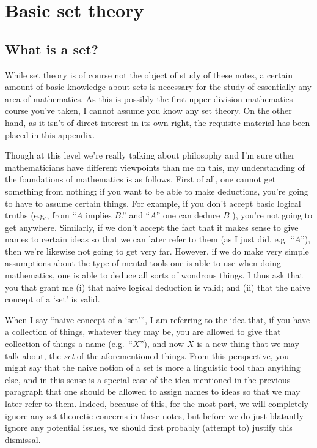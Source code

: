 \chapter{Basic set theory}

\section{What is a set?}\label{sbsA.1.1}

While set theory is of course not the object of study of these notes, a certain amount of basic knowledge about sets is necessary for the study of essentially any area of mathematics.  As this is possibly the first upper-division mathematics course you've taken, I cannot assume you know any set theory.  On the other hand, as it isn't of direct interest in its own right, the requisite material has been placed in this appendix.

Though at this level we're really talking about philosophy and I'm sure other mathematicians have different viewpoints than me on this, my understanding of the foundations of mathematics is as follows.  First of all, one cannot get something from nothing; if you want to be able to make deductions, you're going to have to assume certain things.  For example, if you don't accept basic logical truths (e.g., from ``$A$ implies $B$.'' and ``$A$'' one can deduce $B$ ), you're not going to get anywhere.  Similarly, if we don't accept the fact that it makes sense to give names to certain ideas so that we can later refer to them (as I just did, e.g. ``$A$''), then we're likewise not going to get very far.  However, if we do make very simple assumptions about the type of mental tools one is able to use when doing mathematics, one is able to deduce all sorts of wondrous things.  I thus ask that you that grant me (i) that naive logical deduction is valid; and (ii) that the naive concept of a `set' is valid.

When I say ``naive concept of a `set'{}'', I am referring to the idea that, if you have a collection of things, whatever they may be, you are allowed to give that collection of things a name (e.g.~``$X$''), and now $X$ is a new thing that we may talk about, the \emph{set} of the aforementioned things.  From this perspective, you might say that the naive notion of a set is more a linguistic tool than anything else, and in this sense is a special case of the idea mentioned in the previous paragraph that one should be allowed to assign names to ideas so that we may later refer to them.  Indeed, because of this, for the most part, we will completely ignore any set-theoretic concerns in these notes, but before we do just blatantly ignore any potential issues, we should first probably (attempt to) justify this dismissal.

